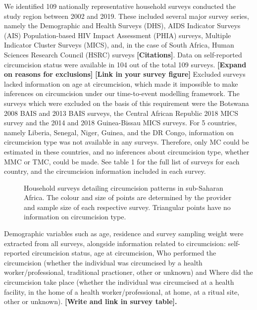 \documentclass{article}
\begin{document}
\begin{appendix}
We identified 109 nationally representative household surveys conducted the study region  between 2002 and 2019. 
These included several major survey series, namely the Demographic and Health Surveys (DHS), AIDS Indicator Surveys (AIS) Population-based HIV Impact Assessment (PHIA) surveys, Multiple Indicator Cluster Surveys (MICS), and, in the case of South Africa, Human Sciences Research Council (HSRC) surveys \textbf{[Citations]}. 
Data on self-reported circumcision status were available in 104 out of the total 109 surveys. 
\textbf{[Expand on reasons for exclusions]} \textbf{[Link in your survey figure]} 
Excluded surveys lacked information on age at circumcision, which made it impossible to make inferences on circumcision under our time-to-event modelling framework. The surveys which were excluded on the basis of this requirement were the Botswana 2008 BAIS and 2013 BAIS surveys, the Central African Republic 2018 MICS survey and the 2014 and 2018 Guinea-Bissau MICS surveys.
For 5 countries, namely Liberia, Senegal, Niger, Guinea, and the DR Congo, information on circumcision type was not available in any surveys. Therefore, only MC could be estimated in these countries, and no inferences about circumcision type, whether MMC or TMC, could be made.
See table 1 for the full list of surveys for each country, and the circumcision information included in each survey. 

\begin{figure}[H]
    \centering
    \caption{Household surveys detailing circumcision patterns in sub-Saharan Africa. The colour and size of points are determined by the provider and sample size of each respective survey. Triangular points have no information on circumcision type.}
    \label{fig:enter-label}
\end{figure}

Demographic variables such as age, residence and survey sampling weight were extracted from all surveys, alongside information related to circumcision: self-reported circumcision status, age at circumcision, Who performed the circumcision (whether the individual was circumcised by a health worker/professional, traditional practioner, other or unknown) and Where did the circumcision take place (whether the individual was circumcised at a health facility, in the home of a health worker/professional, at home, at a ritual site, other or unknown). \textbf{[Write and link in survey table].}


\end{appendix}
\end{document}
